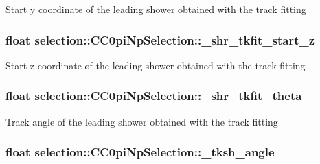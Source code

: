 Start y coordinate of the leading shower obtained with the track fitting \hypertarget{classselection_1_1CC0piNpSelection_a4d3591a8bb7abd9e320f35ca3bf311c2}{
\subsubsection[{\-\_\-shr\-\_\-tkfit\-\_\-start\-\_\-z}]{\setlength{\rightskip}{0pt plus 5cm}float selection\-::\-C\-C0pi\-Np\-Selection\-::\-\_\-shr\-\_\-tkfit\-\_\-start\-\_\-z\hspace{0.3cm}{\ttfamily [private]}}}\label{classselection_1_1CC0piNpSelection_a4d3591a8bb7abd9e320f35ca3bf311c2}
Start z coordinate of the leading shower obtained with the track fitting \hypertarget{classselection_1_1CC0piNpSelection_a11df391e482434665c389423bbb9ec5d}{
\subsubsection[{\-\_\-shr\-\_\-tkfit\-\_\-theta}]{\setlength{\rightskip}{0pt plus 5cm}float selection\-::\-C\-C0pi\-Np\-Selection\-::\-\_\-shr\-\_\-tkfit\-\_\-theta\hspace{0.3cm}{\ttfamily [private]}}}\label{classselection_1_1CC0piNpSelection_a11df391e482434665c389423bbb9ec5d}
Track angle of the leading shower obtained with the track fitting \hypertarget{classselection_1_1CC0piNpSelection_a959adc6093ff4d2730dac8f75dd1245c}{
\subsubsection[{\-\_\-tksh\-\_\-angle}]{\setlength{\rightskip}{0pt plus 5cm}float selection\-::\-C\-C0pi\-Np\-Selection\-::\-\_\-tksh\-\_\-angle\hspace{0.3cm}{\ttfamily [private]}}}\label{classselection_1_1CC0piNpSelection_a959adc6093ff4d2730dac8f75dd1245c}

